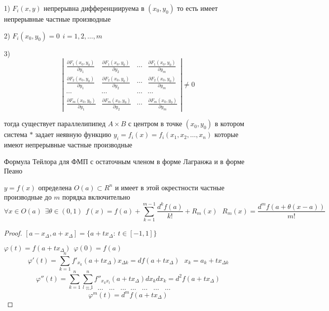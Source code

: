 \begin{theorem}
  1) $F_i(x, y)$ непрерывна дифференциируема в $(x_0, y_0)$ то есть имеет
  непрерывные частные производные

  2) $F_i(x_0, y_0) = 0 ~~ i = 1,2, \ldots, m$

  3)
  $$
  \left|
  \begin{array}{cccc}
    \frac{\partial F_1(x_0, y_0)}{\partial y_1} &
    \frac{\partial F_1(x_0, y_0)}{\partial y_2} &
    \cdots &
    \frac{\partial F_1(x_0, y_0)}{\partial y_m} \\

    \frac{\partial F_2(x_0, y_0)}{\partial y_1} &
    \frac{\partial F_2(x_0, y_0)}{\partial y_2} &
    \cdots &
    \frac{\partial F_2(x_0, y_0)}{\partial y_m} \\

    \cdots & \cdots &\cdots &\cdots \\

    \frac{\partial F_m(x_0, y_0)}{\partial y_1} &
    \frac{\partial F_m(x_0, y_0)}{\partial y_2} &
    \cdots &
    \frac{\partial F_m(x_0, y_0)}{\partial y_m}
  \end{array}
  \right| \not= 0
  $$

  тогда существует параллелипипед $A \times B$ с центром в точке $(x_0, y_0)$
  в котором система $*$ задает неявную функцию
  $y_i = f_i(x) = f_i(x_1, x_2, \ldots, x_n)$ которые имеют непрерывные частные
  производные
\end{theorem}

\begin{title}[\Large]
  Формула Тейлора для ФМП с остаточным членом в форме Лагранжа и в форме Пеано
\end{title}

\begin{theorem}
  $y = f(x)$ определена $O(a) \subset R^n$ и имеет в этой окрестности частные
  производные до $m$ порядка включительно
  $$
  \forall x \in O(a) ~~ \exists \theta \in (0, 1) ~~
  f(x) = f(a) + \sum_{k=1}^{m-1} \frac{d^k f(a)}{k!} + R_m(x) ~~~
  R_m(x) = \frac{d^m f(a + \theta(x-a))}{m!}
  $$
\end{theorem}

\begin{proof}
  $[a - x_{\Delta}, a + x_{\Delta}] = \{ a + tx_{\Delta}: ~ t \in [-1, 1] \}$

  $\varphi(t) = f(a + tx_{\Delta}) ~~ \varphi(0) = f(a)$
  $$
  \varphi'(t) = \sum_{k=1}^n f'_{x_k}(a + tx_{\Delta})x_{\Delta k} =
  df(a + tx_{\Delta}) ~~~ x_k = a_k + tx_{\Delta k}
  $$
  $$
  \varphi''(t) = \sum_{k=1}^n \sum_{l=1}^n f''_{x_k x_l}
  (a + tx_{\Delta})dx_k dx_k = d^2f(a + tx_{\Delta})
  $$
  $$
  \cdots ~~~~ \cdots ~~~~\cdots ~~~~\cdots ~~~ \cdots ~~~~ \cdots ~~~~
  \cdots ~~~~\cdots
  $$
  $$
  \varphi^m(t) = d^m f(a + tx_{\Delta})
  $$
\end{proof}

